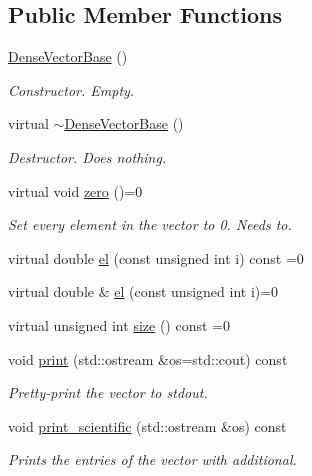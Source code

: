\subsection*{Public Member Functions}
\begin{DoxyCompactItemize}
\item 
\mbox{\hyperlink{classfemus_1_1_dense_vector_base_ab8222fa8625cb42d2740294a088698f8}{Dense\+Vector\+Base}} ()
\begin{DoxyCompactList}\small\item\em Constructor. Empty. \end{DoxyCompactList}\item 
virtual \mbox{\hyperlink{classfemus_1_1_dense_vector_base_a0c3531c7d5cd8d9b2e5b7d63b97ab555}{$\sim$\+Dense\+Vector\+Base}} ()
\begin{DoxyCompactList}\small\item\em Destructor. Does nothing. \end{DoxyCompactList}\item 
virtual void \mbox{\hyperlink{classfemus_1_1_dense_vector_base_abd1b93469867212f796c7b86d242c550}{zero}} ()=0
\begin{DoxyCompactList}\small\item\em Set every element in the vector to 0. Needs to. \end{DoxyCompactList}\item 
virtual double \mbox{\hyperlink{classfemus_1_1_dense_vector_base_ae2a833cdebb39552185cb66b139758e8}{el}} (const unsigned int i) const =0
\item 
virtual double \& \mbox{\hyperlink{classfemus_1_1_dense_vector_base_a521863934215d5f43225004b091864f5}{el}} (const unsigned int i)=0
\item 
virtual unsigned int \mbox{\hyperlink{classfemus_1_1_dense_vector_base_a642849a48ad4800945952af17c1e30c9}{size}} () const =0
\item 
void \mbox{\hyperlink{classfemus_1_1_dense_vector_base_a19f3668a4fbc40cc79d954030ed521df}{print}} (std\+::ostream \&os=std\+::cout) const
\begin{DoxyCompactList}\small\item\em Pretty-\/print the vector to {\ttfamily stdout}. \end{DoxyCompactList}\item 
void \mbox{\hyperlink{classfemus_1_1_dense_vector_base_a9397ba2e7af03c1f509dbdc1a30a67ff}{print\+\_\+scientific}} (std\+::ostream \&os) const
\begin{DoxyCompactList}\small\item\em Prints the entries of the vector with additional. \end{DoxyCompactList}\end{DoxyCompactItemize}
